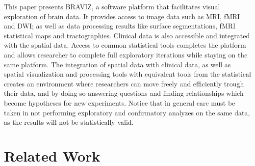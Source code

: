 \documentclass[utf8,paper]{frontiersSCNS} %
\begin{document}
This paper presents BRAVIZ, a software platform that facilitates visual exploration of brain data. It provides access to image data such as MRI, fMRI and DWI; as well as data processing results like surface segmentations, fMRI statistical maps and tractographies. Clinical data is also accessible and integrated with the spatial data. Access to common statistical tools completes the platform and allows researcher to complete full exploratory iterations while staying on the same platform. The integration of spatial data with clinical data, as well as spatial visualization and processing tools with equivalent tools from the statistical creates an environment where researchers can move freely and efficiently trough their data, and by doing so answering questions and finding relationships which become hypotheses for new experiments. Notice that in general care must be taken in not performing exploratory and confirmatory analyzes on the same data, as the results will not be statistically valid.



%


\section{Related Work}
\end{document}
